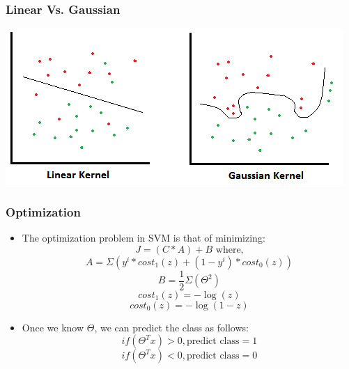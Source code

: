 \documentclass[11pt,xcolor=dvipsnames]{beamer}
\begin{document}
\begin{frame}
\frametitle{Linear Vs. Gaussian}
\centering
\includegraphics[scale=0.72]{linear_gaussian.png}
\end{frame}


\begin{frame}
\frametitle{Optimization}
\begin{itemize}
\item The optimization problem in SVM is that of minimizing:\\
\begin{displaymath}J = (C * A) + B \text{    where,}\end{displaymath}
\begin{displaymath}A = \Sigma(y^i * cost_{1}(z)  +  (1-y^i) * cost_{0}(z))\end{displaymath}    
\begin{displaymath}B = \frac{1}{2} \Sigma(\Theta^2)\end{displaymath}
\begin{displaymath}cost_{1}(z) = -\log(z)\end{displaymath}
\begin{displaymath}cost_{0}(z) = -\log(1 - z)\end{displaymath}
\item Once we know $\Theta$, we can predict the class as follows: \\
\begin{displaymath}if(\Theta^Tx) > 0, \text{predict class} = 1\end{displaymath}
\begin{displaymath}if(\Theta^Tx) < 0, \text{predict class} = 0\end{displaymath}
\end{itemize}
\end{frame}
\end{document}
